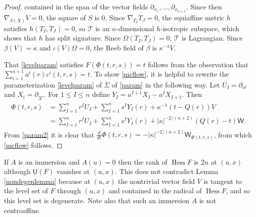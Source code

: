 \documentclass [leqno, 10pt]{amsart}
\theoremstyle{definition}
\numberwithin{equation}{section}
\newcommand{\Om}{\Omega}
\newcommand{\imt}{\iota}
\newcommand{\U}{\mathsf{U}}
\newcommand{\hess}{\operatorname{Hess}}
\newcommand{\ka}{\kappa}
\newcommand{\T}{\mathcal{T}}
\newcommand{\nm}{\mathsf{W}}
\newcommand{\pr}{\partial}
\newcommand{\be}{\beta}
\begin{document}
\begin{proof}
contained in the span of the vector fields $\pr_{x_{1}}, \dots, \pr_{x_{n+1}}$. Since then $\nabla_{S(X)}V = 0$, the square of $S$ is $0$. Since $\nabla_{T_{I}}T_{J} = 0$, the equiaffine metric $h$ satisfies $h(T_{I}, T_{J}) = 0$, so $\T$ is an $n$-dimensional $h$-isotropic subspace, which shows that $h$ has split signature. Since $\Om(T_{I}, T_{J}) = 0$, $\T$ is Lagrangian. Since $\be(V) = \ka$ and $\imt(V)\Om = 0$, the Reeb field of $\be$ is $\ka^{-1}V$.

That \eqref{levelparam} satisfies $F(\Phi(t, r, s)) = t$ follows from the observation that $\sum_{i = 1}^{n+1}a^{i}(r)c^{i}(t, r, s) = t$. To show \eqref{mcflow}, it is helpful to rewrite the parameterization \eqref{levelparam} of $\Sigma$ of \eqref{param} in the following way. Let $U_{I} = \pr_{u^{I}}$ and $X_{i} = \pr_{X^{i}}$. For $1 \leq I \leq n$ define $Y_{I} = a^{I+1}X_{I} - a^{I}X_{I+1}$. Then 
\begin{align}\label{param2}
\begin{split}
\Phi(t, r, s) &= \sum_{I = 1}^{n}r^{I}U_{I} + \sum_{I = 1}^{n}s^{I}Y_{I}(r) + \ka^{-1}(t - Q(r))V \\
&= \sum_{I = 1}^{n}r^{I}U_{I} + \sum_{I = 1}^{n}s^{I}Y_{I}(r) + |\ka|^{-2/(n+2)}(Q(r) - t)\nm .
\end{split}
\end{align}
From \eqref{param2} it is clear that $\tfrac{d}{dt}\Phi(t, r, s) = -|\ka|^{-2/(n+2)}\nm_{\Phi(t, r, s)}$, from which \eqref{mcflow} follows.
\end{proof}

\begin{remark}
If $A$ is an immersion and $A(u) = 0$ then the rank of $\hess F$ is $2n$ at $(u, x)$ although $\U(F)$ vanishes at $(u, x)$. This does not contradict Lemma \ref{nondegenlemma} because at $(u, x)$ the nontrivial vector field $V$ is tangent to the level set of $F$ through $(u, x)$ and contained in the radical of $\hess F$, and so this level set is degenerate. Note also that such an immersion $A$ is not centroaffine.
\end{remark}
\end{document}

